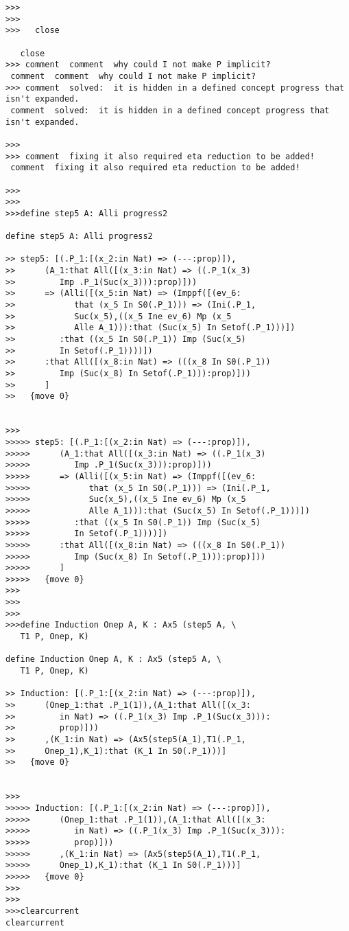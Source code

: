 \documentclass{article}
\begin{document}
\begin{verbatim}
>>>
>>>
>>>   close

   close
>>> comment  comment  why could I not make P implicit?
 comment  comment  why could I not make P implicit?
>>> comment  solved:  it is hidden in a defined concept progress that isn't expanded.
 comment  solved:  it is hidden in a defined concept progress that isn't expanded.

>>>
>>> comment  fixing it also required eta reduction to be added!
 comment  fixing it also required eta reduction to be added!

>>>
>>>
>>>define step5 A: Alli progress2

define step5 A: Alli progress2

>> step5: [(.P_1:[(x_2:in Nat) => (---:prop)]),
>>      (A_1:that All([(x_3:in Nat) => ((.P_1(x_3)
>>         Imp .P_1(Suc(x_3))):prop)]))
>>      => (Alli([(x_5:in Nat) => (Imppf([(ev_6:
>>            that (x_5 In S0(.P_1))) => (Ini(.P_1,
>>            Suc(x_5),((x_5 Ine ev_6) Mp (x_5
>>            Alle A_1))):that (Suc(x_5) In Setof(.P_1)))])
>>         :that ((x_5 In S0(.P_1)) Imp (Suc(x_5)
>>         In Setof(.P_1))))])
>>      :that All([(x_8:in Nat) => (((x_8 In S0(.P_1))
>>         Imp (Suc(x_8) In Setof(.P_1))):prop)]))
>>      ]
>>   {move 0}


>>>
>>>>> step5: [(.P_1:[(x_2:in Nat) => (---:prop)]),
>>>>>      (A_1:that All([(x_3:in Nat) => ((.P_1(x_3)
>>>>>         Imp .P_1(Suc(x_3))):prop)]))
>>>>>      => (Alli([(x_5:in Nat) => (Imppf([(ev_6:
>>>>>            that (x_5 In S0(.P_1))) => (Ini(.P_1,
>>>>>            Suc(x_5),((x_5 Ine ev_6) Mp (x_5
>>>>>            Alle A_1))):that (Suc(x_5) In Setof(.P_1)))])
>>>>>         :that ((x_5 In S0(.P_1)) Imp (Suc(x_5)
>>>>>         In Setof(.P_1))))])
>>>>>      :that All([(x_8:in Nat) => (((x_8 In S0(.P_1))
>>>>>         Imp (Suc(x_8) In Setof(.P_1))):prop)]))
>>>>>      ]
>>>>>   {move 0}
>>>
>>>
>>>
>>>define Induction Onep A, K : Ax5 (step5 A, \
   T1 P, Onep, K)

define Induction Onep A, K : Ax5 (step5 A, \
   T1 P, Onep, K)

>> Induction: [(.P_1:[(x_2:in Nat) => (---:prop)]),
>>      (Onep_1:that .P_1(1)),(A_1:that All([(x_3:
>>         in Nat) => ((.P_1(x_3) Imp .P_1(Suc(x_3))):
>>         prop)]))
>>      ,(K_1:in Nat) => (Ax5(step5(A_1),T1(.P_1,
>>      Onep_1),K_1):that (K_1 In S0(.P_1)))]
>>   {move 0}


>>>
>>>>> Induction: [(.P_1:[(x_2:in Nat) => (---:prop)]),
>>>>>      (Onep_1:that .P_1(1)),(A_1:that All([(x_3:
>>>>>         in Nat) => ((.P_1(x_3) Imp .P_1(Suc(x_3))):
>>>>>         prop)]))
>>>>>      ,(K_1:in Nat) => (Ax5(step5(A_1),T1(.P_1,
>>>>>      Onep_1),K_1):that (K_1 In S0(.P_1)))]
>>>>>   {move 0}
>>>
>>>
>>>clearcurrent
clearcurrent


\end{verbatim}
\end{document}

